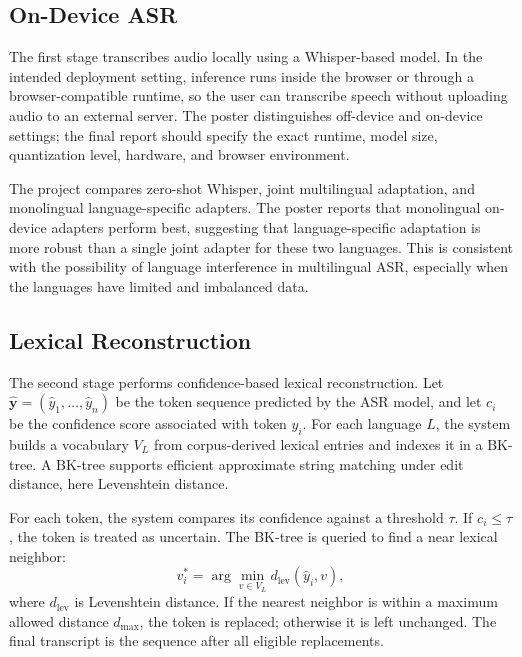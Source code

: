 \documentclass[11pt]{article}
\begin{document}
\subsection{On-Device ASR}

The first stage transcribes audio locally using a Whisper-based model. In the intended deployment setting, inference runs inside the browser or through a browser-compatible runtime, so the user can transcribe speech without uploading audio to an external server. The poster distinguishes off-device and on-device settings; the final report should specify the exact runtime, model size, quantization level, hardware, and browser environment.

The project compares zero-shot Whisper, joint multilingual adaptation, and monolingual language-specific adapters. The poster reports that monolingual on-device adapters perform best, suggesting that language-specific adaptation is more robust than a single joint adapter for these two languages. This is consistent with the possibility of language interference in multilingual ASR, especially when the languages have limited and imbalanced data.

\subsection{Lexical Reconstruction}

The second stage performs confidence-based lexical reconstruction. Let $\hat{\mathbf{y}} = (\hat{y}_1, \ldots, \hat{y}_n)$ be the token sequence predicted by the ASR model, and let $c_i$ be the confidence score associated with token $\hat{y}_i$. For each language $L$, the system builds a vocabulary $V_L$ from corpus-derived lexical entries and indexes it in a BK-tree. A BK-tree supports efficient approximate string matching under edit distance, here Levenshtein distance.

For each token, the system compares its confidence against a threshold $\tau$. If $c_i \leq \tau$, the token is treated as uncertain. The BK-tree is queried to find a near lexical neighbor:
\begin{equation}
    v_i^* = \arg\min_{v \in V_L} d_{\mathrm{lev}}(\hat{y}_i, v),
\end{equation}
where $d_{\mathrm{lev}}$ is Levenshtein distance. If the nearest neighbor is within a maximum allowed distance $d_{\max}$, the token is replaced; otherwise it is left unchanged. The final transcript is the sequence after all eligible replacements.
\end{document}
